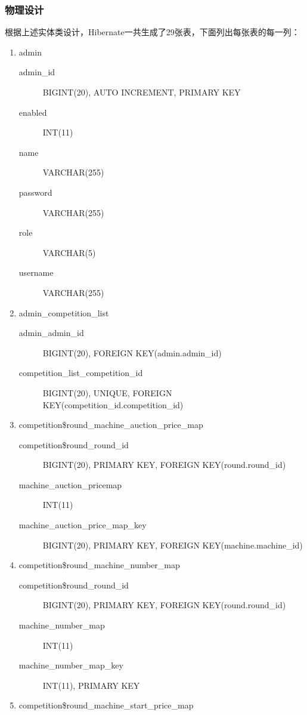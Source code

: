 \documentclass{article}
\begin{document}
\subsubsection{物理设计}
根据上述实体类设计，Hibernate一共生成了29张表，下面列出每张表的每一列：
\small{
\begin{enumerate}
  \item admin
    \begin{description}
      \item [admin\_id] BIGINT(20), AUTO INCREMENT, PRIMARY KEY
      \item [enabled] INT(11)
      \item [name] VARCHAR(255)
      \item [password] VARCHAR(255)
      \item [role] VARCHAR(5)
      \item [username] VARCHAR(255)
    \end{description}
  \item admin\_competition\_list
    \begin{description}
      \item[admin\_admin\_id] BIGINT(20), FOREIGN KEY(admin.admin\_id)
      \item[competition\_list\_competition\_id] BIGINT(20), UNIQUE, FOREIGN KEY(competition\_id.competition\_id)
    \end{description}
  \item competition\$round\_machine\_auction\_price\_map
    \begin{description}
      \item[competition\$round\_round\_id] BIGINT(20), PRIMARY KEY, FOREIGN KEY(round.round\_id)
      \item[machine\_auction\_pricemap] INT(11)
      \item[machine\_auction\_price\_map\_key] BIGINT(20), PRIMARY KEY, FOREIGN KEY(machine.machine\_id)
    \end{description}
  \item competition\$round\_machine\_number\_map
    \begin{description}
      \item[competition\$round\_round\_id] BIGINT(20), PRIMARY KEY, FOREIGN KEY(round.round\_id)
      \item[machine\_number\_map] INT(11)
      \item[machine\_number\_map\_key] INT(11), PRIMARY KEY
    \end{description}
  \item competition\$round\_machine\_start\_price\_map

\end{enumerate}}
\end{document}
